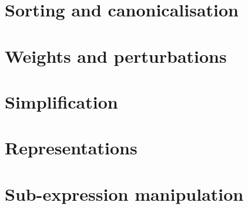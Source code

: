 \documentclass[11pt]{book}
\begin{document}






\section{Sorting and canonicalisation}
  








\section{Weights and perturbations}




\section{Simplification}






\section{Representations}





\section{Sub-expression manipulation}





\printbibliography
\end{document}
